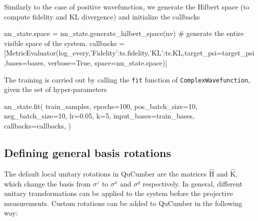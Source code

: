\documentclass[submission, Phys]{SciPost}
\begin{document}
Similarly to the case of positive wavefunction, we generate the Hilbert space (to compute fidelity and KL divergence) and initialize the callbacks
\begin{python}
nn_state.space = nn_state.generate_hilbert_space(nv) # generate the entire visible space of the system.
callbacks      = [MetricEvaluator(log_every,{'Fidelity':ts.fidelity,'KL':ts.KL},target_psi=target_psi,bases=bases,
                                  verbose=True, space=nn_state.space)]
\end{python}
The training is carried out by calling the \verb|fit| function of \verb|ComplexWavefunction|, given the set of hyper-parameters
\begin{python}
nn_state.fit(
    train_samples,
    epochs=100,
    pos_batch_size=10,
    neg_batch_size=10,
    lr=0.05,
    k=5,
    input_bases=train_bases,
    callbacks=callbacks,
)
\end{python}
%
%
%
%
%

\subsection{Defining general basis rotations}
The default local unitary rotations in QuCumber are the matrices $\hat{\mathrm{H}}$ and $\hat{\mathrm{K}}$, which change the basis from $\sigma^z$ to $\sigma^x$ and $\sigma^y$ respectively. In general, different unitary transformations can be applied to the system before the projective measurements. Custom rotations can be added to QuCumber in the following way:
\end{document}
